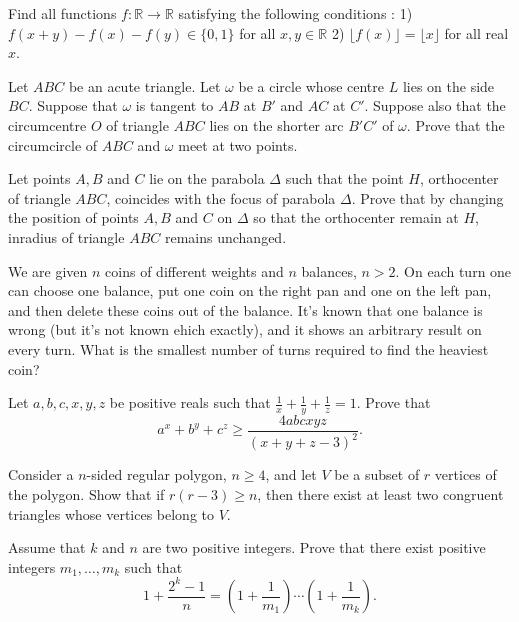 \documentclass[11pt]{scrartcl}
\begin{document}
\begin{problem}[549237375256018]
Find all functions $f : \mathbb{R} \rightarrow \mathbb{R}$ satisfying the following conditions :
1) $f(x+y)-f(x)-f(y) \in \{0,1\} $ for all $x,y \in \mathbb{R}$
2) $\lfloor f(x) \rfloor = \lfloor x \rfloor $ for all real $x$.
\end{problem}
\begin{problem}[5379858391330892049]
Let $ABC$ be an acute triangle. Let $\omega$ be a circle whose centre $L$ lies on the side $BC$. Suppose that $\omega$ is tangent to $AB$ at $B'$ and $AC$ at $C'$. Suppose also that the circumcentre $O$ of triangle $ABC$ lies on the shorter arc $B'C'$ of $\omega$. Prove that the circumcircle of $ABC$ and $\omega$ meet at two points.
\end{problem}
\begin{problem}[8725820796958956406]
	Let points $A, B$ and $C$ lie on the parabola $\Delta$ such that the point $H$, orthocenter of triangle $ABC$, coincides
with the focus of parabola $\Delta$. Prove that by changing the position of points $A, B$ and $C$ on $\Delta$ so that the orthocenter remain at $H$, inradius of triangle $ABC$ remains unchanged.
\end{problem}
\begin{problem}[2211812924503059239]
	We are given $n$ coins of different weights and $n$ balances, $n>2$. On each turn one can choose one balance, put one coin on the right pan and one on the left pan, and then delete these coins out of the balance. It's known that one balance is wrong (but it's not known ehich exactly), and it shows an arbitrary result on every turn. What is the smallest number of turns required to find the heaviest coin?
\end{problem}
\begin{problem}[9083308405590075982]
	Let $a, b, c,x, y, z$ be positive reals such that $\frac{1}{x}+\frac{1}{y}+\frac{1}{z}=1$. Prove that\[a^x+b^y+c^z\ge \frac{4abcxyz}{(x+y+z-3)^2}.\]
\end{problem}
\begin{problem}[3173124324482060330]
Consider a $n$-sided regular polygon, $n \geq 4$, and let $V$ be a subset of $r$ vertices of the polygon. Show that if $r(r-3) \geq n$, then there exist at least two congruent triangles whose vertices belong to $V$.
\end{problem}
\begin{problem}[139398523212430]
	Assume that $k$ and $n$ are two positive integers. Prove that there exist positive integers $m_1 , \dots , m_k$ such that\[1+\frac{2^k-1}{n}=\left(1+\frac1{m_1}\right)\cdots \left(1+\frac1{m_k}\right).\]
\end{problem}
\end{document}
